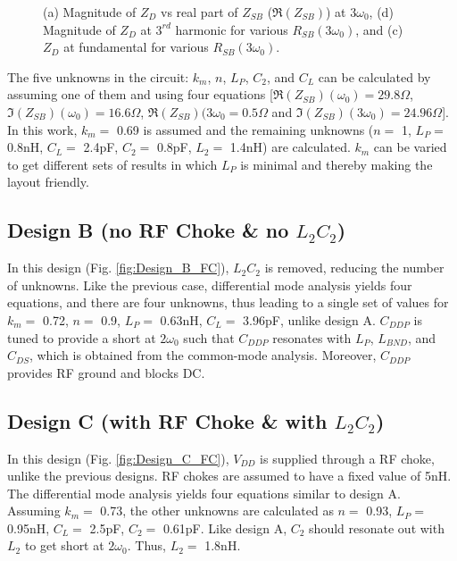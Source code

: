 \documentclass[conference]{IEEEtran}
\begin{document}
\begin{figure}[!t]
\begin{subfigure}{0.5\textwidth}
\caption{}
\label{fig:Design_A_Rn_var_1H}
\end{subfigure}
\caption{(a) Magnitude of $Z_{D}$ vs real part of $Z_{SB}$ ($\Re(Z_{SB})$) at $3\omega_0$, (d) Magnitude of $Z_D$ at $3^{rd}$ harmonic for various $R_{SB}(3\omega_0)$, and (c) $Z_D$ at fundamental for various $R_{SB}(3\omega_0)$.}
\label{fig:Design_A_Rn_var}
\vspace{-0.2in}
\end{figure}

The five unknowns in the circuit: $k_m$, $n$, $L_P$, $C_2$, and $C_L$ can be calculated by assuming one of them and using four equations [$\Re(Z_{SB})(\omega_0) =  29.8 \Omega$, $\Im(Z_{SB})(\omega_0) = 16.6\Omega$, $\Re(Z_{SB})(3\omega_0 = 0.5\Omega$ and  $\Im(Z_{SB})(3\omega_0) = 24.96\Omega$]. In this work, $k_m=$ 0.69 is assumed and the remaining unknowns ($n =$ 1, $L_P =$ 0.8nH, $C_L =$ 2.4pF, $C_2 =$ 0.8pF, $L_2 =$ 1.4nH) are calculated. $k_m$ can be varied to get different sets of results in which $L_P$ is minimal and thereby making the layout friendly.


\subsection{Design B (no RF Choke \& no $L_2C_2$)}
In this design (Fig. \ref{fig:Design_B_FC}), $L_2C_2$ is removed, reducing the number of unknowns. Like the previous case, differential mode analysis yields four equations, and there are four unknowns, thus leading to a single set of values for $k_m=$ 0.72, $n =$ 0.9, $L_P =$ 0.63nH, $C_L =$ 3.96pF, unlike design A. $C_{DDP}$ is tuned to provide a short at $2\omega_0$ such that $C_{DDP}$ resonates with $L_P$, $L_{BND}$, and $C_{DS}$, which is obtained from the common-mode analysis. Moreover, $C_{DDP}$ provides RF ground and blocks DC.

\subsection{Design C (with RF Choke \& with $L_2C_2$)}
In this design (Fig. \ref{fig:Design_C_FC}), $V_{DD}$ is supplied through a RF choke, unlike the previous designs. RF chokes are assumed to have a fixed value of 5nH. The differential mode analysis yields four equations similar to design A. Assuming $k_m=$ 0.73, the other unknowns are calculated as $n =$ 0.93, $L_P =$ 0.95nH, $C_L =$ 2.5pF, $C_2 =$ 0.61pF.
Like design A, $C_2$ should resonate out with $L_2$ to get short at $2\omega_0$. Thus, $L_2 =$ 1.8nH. 
\end{document}
